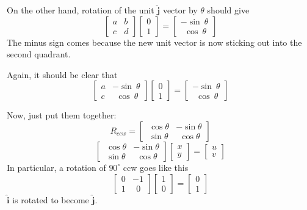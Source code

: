 \documentclass[11pt, oneside]{article}   	%
\begin{document}
On the other hand, rotation of the unit $\hat{\mathbf{j}}$ vector by $\theta$ should give
\[
\begin{bmatrix}  
a & b  \\  
c & d  
\end{bmatrix}
\begin{bmatrix}  
0  \\  
1  
\end{bmatrix}
=
\begin{bmatrix}  
-\sin \  \theta  \\  
\ \ \cos \  \theta  
\end{bmatrix}
\]
The minus sign comes because the new unit vector is now sticking out into the second quadrant.

Again, it should be clear that 
\[
\begin{bmatrix}  
a & -\sin \  \theta  \\  
c & \ \ \cos \  \theta  
\end{bmatrix}
\begin{bmatrix}  
0  \\  
1  
\end{bmatrix}
=
\begin{bmatrix}  
-\sin \  \theta  \\  
\ \ \cos \  \theta  
\end{bmatrix}
\]

Now, just put them together:
\[
R_{ccw} = 
\begin{bmatrix}   \ \cos \theta & -\sin \theta  \\  \ \sin \theta & \ \ \cos \theta  \end{bmatrix}
\]
\[
\begin{bmatrix}   \ \cos \theta & -\sin \theta  \\  \ \sin \theta & \ \ \cos \theta  \end{bmatrix}
\begin{bmatrix}   x   \\  y  \end{bmatrix} = \begin{bmatrix}   u   \\  v  \end{bmatrix}
\]
In particular, a rotation of $90^{\circ}$ ccw goes like this
\[
\begin{bmatrix}   0 & -1  \\  1 & \ \ 0  \end{bmatrix}
\begin{bmatrix}   1   \\  0  \end{bmatrix} = \begin{bmatrix}   0   \\  1  \end{bmatrix}
\]
$\hat{\mathbf{i}}$ is rotated to become $\hat{\mathbf{j}}$.
\end{document}
